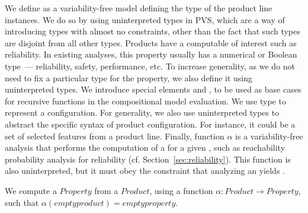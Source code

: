 We define  as a variability-free model defining the type of the product line instances. 
We do so by using uninterpreted types in PVS, which are a way of introducing types with almost no constraints, other than the fact that such types are disjoint from all other types. 
Products have a computable  of interest such as reliability. In existing analyses, this property usually has a numerical or Boolean type~\cite{Thum2014}---%
reliability, safety, performance, etc.
To increase generality, as we do not need to fix a particular type for the property, we also define it using uninterpreted types. 
We introduce special elements  and , to be used as base cases for recursive functions in the compositional model evaluation.
We use type  to represent a configuration. For generality, we also use uninterpreted types to abstract the specific syntax of product configuration. For instance, it could be a set of selected features from a product line. 
Finally, function $\alpha$ is a variability-free analysis that performs the computation of a  for a given , such as reachability probability analysis for reliability (cf. Section~\ref{sec:reliability}). 
This function is also uninterpreted, but it must obey the constraint that analyzing an  yields .
 

\begin{definition}
\label{defn:alpha}
We compute a $Property$ from a $Product$, using a function $\alpha : Product \rightarrow Property$, such that $\alpha(emptyproduct)=emptyproperty$.
\end{definition} 


